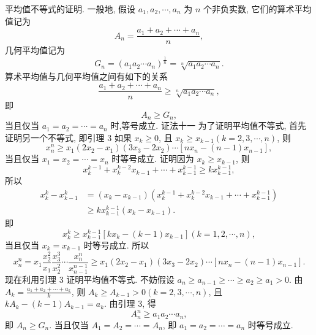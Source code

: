 平均值不等式的证明.
一般地, 假设 $a_1, a_2, \cdots, a_n$ 为 $n$ 个非负实数, 它们的算术平均值记为
$$
A_n=\frac{a_1+a_2+\cdots+a_n}{n},
$$
几何平均值记为
$$
G_n=\left(a_1 a_2 \cdots a_n\right)^{\frac{1}{n}}=\sqrt[n]{a_1 a_2 \cdots a_n} .
$$
算术平均值与几何平均值之间有如下的关系
$$
\frac{a_1+a_2+\cdots+a_n}{n} \geqslant \sqrt[n]{a_1 a_2 \cdots a_n},
$$
即
$$
A_n \geqslant G_n,
$$
当且仅当 $a_1=a_2=\cdots=a_n$ 时,等号成立.
证法十一
为了证明平均值不等式, 首先证明另一个不等式, 即引理 3 如果 $x_k \geqslant 0$, 且 $x_k \geqslant x_{k-1}(k=2,3, \cdots, n)$, 则
$$
x_n^n \geqslant x_1\left(2 x_2-x_1\right)\left(3 x_3-2 x_2\right) \cdots\left[n x_n-(n-1) x_{n-1}\right],
$$
当且仅当 $x_1=x_2=\cdots=x_n$ 时等号成立.
证明因为 $x_k \geqslant x_{k-1}$, 则
$$
x_k^{k-1}+x_k^{k-2} x_{k-1}+\cdots+x_{k-1}^{k-1} \geqslant k x_{k-1}^{k-1},
$$
所以
$$
\begin{aligned}
x_k^k-x_{k-1}^k & =\left(x_k-x_{k-1}\right)\left(x_k^{k-1}+x_k^{k-2} x_{k-1}+\cdots+x_{k-1}^{k-1}\right) \\
& \geqslant k x_{k-1}^{k-1}\left(x_k-x_{k-1}\right) .
\end{aligned}
$$
即
$$
x_k^k \geqslant x_{k-1}^{k-1}\left[k x_k-(k-1) x_{k-1}\right](k=1,2, \cdots, n),
$$
当且仅当 $x_k=x_{k-1}$ 时等号成立.
所以
$$
x_n^n=x_1 \frac{x_2^2}{x_1} \frac{x_3^3}{x_2^2} \cdots \frac{x_n^n}{x_{n-1}^{n-1}} \geqslant x_1\left(2 x_2-x_1\right)\left(3 x_3-2 x_2\right) \cdots\left[n x_n-(n-1) x_{n-1}\right] .
$$
现在利用引理 3 证明平均值不等式.
不妨假设 $a_n \geqslant a_{n-1} \geqslant \cdots \geqslant a_2 \geqslant a_1>0$. 由 $A_k=\frac{a_1+a_2+\cdots+a_k}{k}$, 则 $A_k \geqslant A_{k-1}>0(k=2,3, \cdots, n)$, 且 $k A_k-(k-1) A_{k-1}=a_k$. 由引理 3, 得
$$
A_n^n \geqslant a_1 a_2 \cdots a_n,
$$
即 $A_n \geqslant G_n$. 当且仅当 $A_1=A_2=\cdots=A_n$, 即 $a_1=a_2=\cdots=a_n$ 时等号成立.



